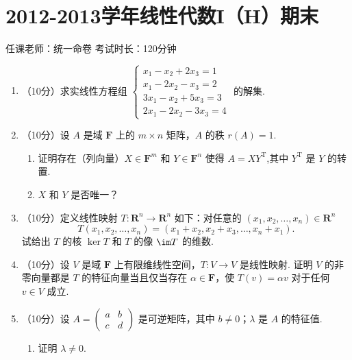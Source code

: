 \section{2012-2013学年线性代数I（H）期末}

\begin{center}
    任课老师：统一命卷\hspace{4em} 考试时长：120分钟
\end{center}

\begin{enumerate}
    \item （10分）求实线性方程组 $\begin{cases}x_1-x_2+2x_3 = 1 \\ x_1-2x_2-x_3=2 \\ 3x_1-x_2+5x_3=3 \\ 2x_1-2x_2-3x_3 = 4\end{cases}$ 的解集.

    \item （10分）设 $A$ 是域 $\mathbf{F}$ 上的 $m\times n$ 矩阵，$A$ 的秩 $r(A)=1$.
    \begin{enumerate}
        \item 证明存在（列向量）$X\in \mathbf{F}^m$ 和 $Y\in \mathbf{F}^n$ 使得 $A=XY^\mathrm{T}$,其中 $Y^\mathrm{T}$ 是 $Y$ 的转置.

        \item $X$ 和 $Y$ 是否唯一？
    \end{enumerate}

\item （10分）定义线性映射 $T\colon \mathbf{R}^n \to \mathbf{R}^n$ 如下：对任意的 $(x_1,x_2,\ldots,x_n) \in \mathbf{R}^n$
    \[T(x_1,x_2,\ldots,x_n)=(x_1+x_2,x_2+x_3,\ldots,x_n+x_1).\]
    试给出 $T$ 的核 $\ker T$ 和 $T$ 的像 $\im T$ 的维数.

\item （10分）设 $V$ 是域 $\mathbf{F}$ 上有限维线性空间，$T\colon V\to V$ 是线性映射. 证明 $V$ 的非零向量都是 $T$ 的特征向量当且仅当存在 $\alpha \in \mathbf{F}$，使 $T(v)=\alpha v$ 对于任何 $v \in V$ 成立.

\item （10分）设 $A=\begin{pmatrix}a & b \\ c & d\end{pmatrix}$ 是可逆矩阵，其中 $b\neq 0$；$\lambda$ 是 $A$ 的特征值.
\begin{enumerate}
    \item 证明 $\lambda \neq 0$.


\end{enumerate}
\end{enumerate}
